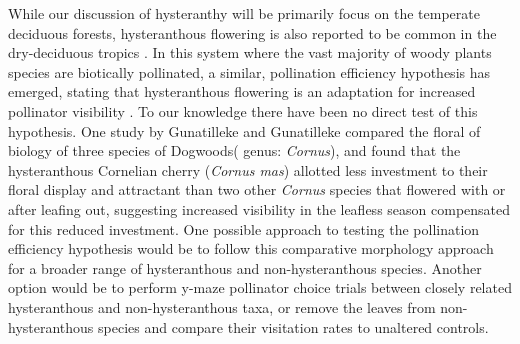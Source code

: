 \documentclass{article}
\begin{document}
\indent While our discussion of hysteranthy will be primarily focus on the temperate deciduous forests, hysteranthous flowering is also reported to be common in the dry-deciduous tropics \citep*{Janzen1967,Franklin2016}. In this system where the vast majority of woody plants species are biotically pollinated, a similar, pollination efficiency hypothesis has emerged, stating that hysteranthous flowering is an adaptation for increased pollinator visibility \citep{Janzen1967}. To our knowledge there have been no direct test of this hypothesis. One study by Gunatilleke and Gunatilleke \citeyear{Guantilleke1984} compared the floral of biology of three species of Dogwoods( genus: \textit{Cornus}), and found that the hysteranthous Cornelian cherry (\textit{Cornus mas}) allotted less investment to their floral display and attractant than two other \textit{Cornus} species that flowered with or after leafing out, suggesting increased visibility in the leafless season compensated for this reduced investment. One possible approach to testing the pollination efficiency hypothesis would be to follow this comparative morphology approach for a broader range of hysteranthous and non-hysteranthous species. Another option would be to perform y-maze pollinator choice trials \citep{Giurfa1997} between closely related hysteranthous and non-hysteranthous taxa, or remove the leaves from non-hysteranthous species and compare their visitation rates to unaltered controls.\\
\end{document}
